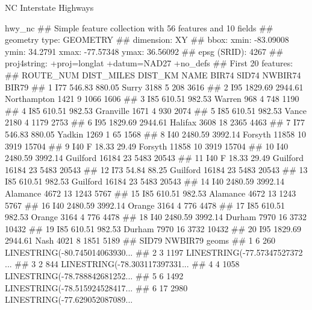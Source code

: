 \documentclass[11pt,ignorenonframetext,]{beamer}
\newenvironment{Shaded}{}{}
\newcommand{\NormalTok}[1]{#1}
\let\oldShaded\Shaded
\let\endoldShaded\endShaded
\renewenvironment{Shaded}{\footnotesize\begin{spacing}{0.9}\oldShaded}{\endoldShaded\end{spacing}}
\begin{document}
\begin{frame}[fragile,t]{NC Interstate Highways}
\begin{Shaded}
\begin{Highlighting}[]
\NormalTok{hwy_nc}
\NormalTok{## Simple feature collection with 56 features and 10 fields}
\NormalTok{## geometry type:  GEOMETRY}
\NormalTok{## dimension:      XY}
\NormalTok{## bbox:           xmin: -83.09008 ymin: 34.2791 xmax: -77.57348 ymax: 36.56092}
\NormalTok{## epsg (SRID):    4267}
\NormalTok{## proj4string:    +proj=longlat +datum=NAD27 +no_defs}
\NormalTok{## First 20 features:}
\NormalTok{##    ROUTE_NUM DIST_MILES DIST_KM        NAME BIR74 SID74 NWBIR74 BIR79}
\NormalTok{## 1        I77     546.83  880.05       Surry  3188     5     208  3616}
\NormalTok{## 2        I95    1829.69 2944.61 Northampton  1421     9    1066  1606}
\NormalTok{## 3        I85     610.51  982.53      Warren   968     4     748  1190}
\NormalTok{## 4        I85     610.51  982.53   Granville  1671     4     930  2074}
\NormalTok{## 5        I85     610.51  982.53       Vance  2180     4    1179  2753}
\NormalTok{## 6        I95    1829.69 2944.61     Halifax  3608    18    2365  4463}
\NormalTok{## 7        I77     546.83  880.05      Yadkin  1269     1      65  1568}
\NormalTok{## 8        I40    2480.59 3992.14     Forsyth 11858    10    3919 15704}
\NormalTok{## 9     I40  F      18.33   29.49     Forsyth 11858    10    3919 15704}
\NormalTok{## 10       I40    2480.59 3992.14    Guilford 16184    23    5483 20543}
\NormalTok{## 11    I40  F      18.33   29.49    Guilford 16184    23    5483 20543}
\NormalTok{## 12       I73      54.84   88.25    Guilford 16184    23    5483 20543}
\NormalTok{## 13       I85     610.51  982.53    Guilford 16184    23    5483 20543}
\NormalTok{## 14       I40    2480.59 3992.14    Alamance  4672    13    1243  5767}
\NormalTok{## 15       I85     610.51  982.53    Alamance  4672    13    1243  5767}
\NormalTok{## 16       I40    2480.59 3992.14      Orange  3164     4     776  4478}
\NormalTok{## 17       I85     610.51  982.53      Orange  3164     4     776  4478}
\NormalTok{## 18       I40    2480.59 3992.14      Durham  7970    16    3732 10432}
\NormalTok{## 19       I85     610.51  982.53      Durham  7970    16    3732 10432}
\NormalTok{## 20       I95    1829.69 2944.61        Nash  4021     8    1851  5189}
\NormalTok{##    SID79 NWBIR79                          geoms}
\NormalTok{## 1      6     260 LINESTRING(-80.745014063930...}
\NormalTok{## 2      3    1197 LINESTRING(-77.57347527372 ...}
\NormalTok{## 3      2     844 LINESTRING(-78.303117397331...}
\NormalTok{## 4      4    1058 LINESTRING(-78.788842681252...}
\NormalTok{## 5      6    1492 LINESTRING(-78.515924528417...}
\NormalTok{## 6     17    2980 LINESTRING(-77.629052087089...}

\end{Highlighting}
\end{Shaded}
\end{frame}
\end{document}
